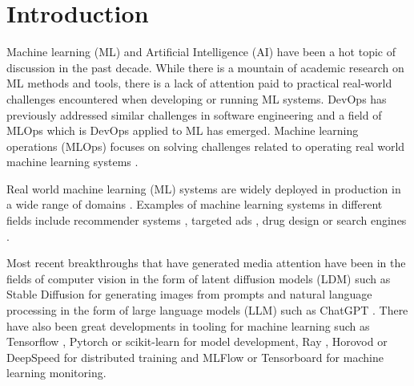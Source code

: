 \chapter{Introduction}
\label{chap:intro}


Machine learning (ML) and Artificial Intelligence (AI) have been a hot topic of discussion in the past decade. While there is a mountain of academic research on ML methods and tools, there is a lack of attention paid to practical real-world challenges encountered when developing or running ML systems. DevOps has previously addressed similar challenges in software engineering and a field of MLOps which is DevOps applied to ML has emerged. Machine learning operations (MLOps) focuses on solving challenges related to operating real world machine learning systems \parencite{kreuzbergerMachineLearningOperations2023}.

Real world machine learning (ML) systems are widely deployed in production in a wide range of domains \parencite{cabreraRealworldMachineLearning2023}.
Examples of machine learning systems in different fields include recommender systems \parencite{liRecentDevelopmentsRecommender2023}, targeted ads \parencite{domingosFewUsefulThings2012}, drug design \parencite{domingosFewUsefulThings2012} or search engines \parencite{domingosFewUsefulThings2012}.

Most recent breakthroughs that have generated media attention have been in the fields of computer vision in the form of latent diffusion models (LDM) \parencite{rombachHighResolutionImageSynthesis2022} such as Stable Diffusion \parencite{stabilityaiStableDiffusionPublic2022} for generating images from prompts and natural language processing in the form of large language models (LLM) \parencite{touvronLLaMAOpenEfficient2023} such as ChatGPT \parencite{openaiIntroducingChatGPT2022}. There have also been great developments in tooling for machine learning such as Tensorflow \parencite{abadiTensorFlowLargeScaleMachine2016}, Pytorch \parencite{paszkePyTorchImperativeStyle2019} or scikit-learn \parencite{pedregosaScikitlearnMachineLearning2011} for model development, Ray \parencite{liawTuneResearchPlatform2018}, Horovod \parencite{sergeevHorovodFastEasy2018} or DeepSpeed \parencite{rasleyDeepSpeedSystemOptimizations2020} for distributed training and MLFlow \parencite{chenDevelopmentsMLflowSystem2020} or Tensorboard \parencite{abadiTensorFlowLargeScaleMachine2016} for machine learning monitoring.

